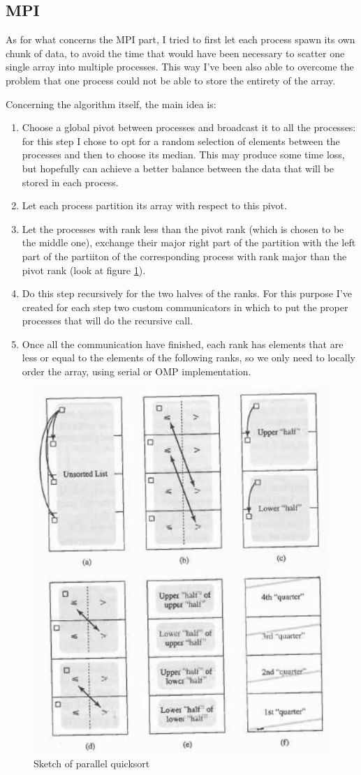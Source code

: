 \documentclass{article}
\begin{document}
	\subsection{MPI}
	As for what concerns the MPI part, I tried to first let each process spawn its own chunk of data, to avoid the time that would have been necessary to scatter one single array into multiple processes. This way I've been also able to overcome the problem that one process could not be able to store the entirety of the array.
	
	Concerning the algorithm itself, the main idea is:
	\begin{enumerate}
		\item Choose a global pivot between processes and broadcast it to all the processes: for this step I chose to opt for a random selection of elements between the processes and then to choose its median. This may produce some time loss, but hopefully can achieve a better balance between the data that will be stored in each process.
		\item Let each process partition its array with respect to this pivot.
		\item Let the processes with rank less than the pivot rank (which is chosen to be the middle one), exchange their major right part of the partition with the left part of the partiiton of the corresponding process with rank major than the pivot rank (look at figure \ref{fig:parallelquicksort}).
		\item Do this step recursively for the two halves of the ranks. For this purpose I've created for each step two custom communicators in which to put the proper processes that will do the recursive call.
		\item Once all the communication have finished, each rank has elements that are less or equal to the elements of the following ranks, so we only need to locally order the array, using serial or OMP implementation.
	\end{enumerate}
	
	\begin{figure}[h]
		\centering
		\includegraphics[height=0.4\linewidth]{Parallel_quicksort}
		\caption{Sketch of parallel quicksort}
		\label{fig:parallelquicksort}
	\end{figure}
	
\end{document}
